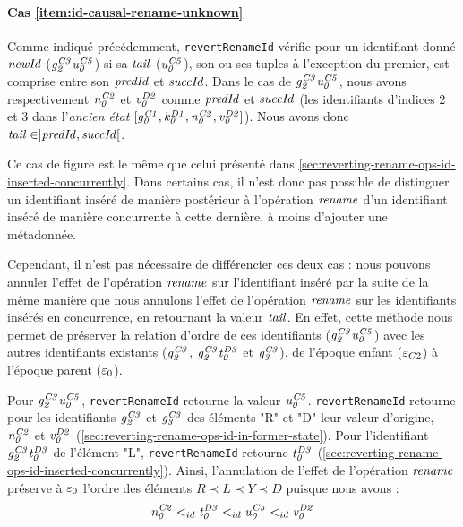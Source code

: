 \paragraph{Cas \ref{item:id-causal-rename-unknown}}

Comme indiqué précédemment, \texttt{revertRenameId} vérifie pour un identifiant donné $\mathit{newId}$ (\eg $\mathit{g}^{\mathit{C3}}_{\mathit{2}}\mathit{u}^{\mathit{C5}}_{\mathit{0}}$) si sa $\mathit{tail}$ ($\mathit{u}^{\mathit{C5}}_{\mathit{0}}$), \ie son ou ses tuples à l'exception du premier, est comprise entre son $\mathit{predId}$ et $\mathit{succId}$.
Dans le cas de $\mathit{g}^{\mathit{C3}}_{\mathit{2}}\mathit{u}^{\mathit{C5}}_{\mathit{0}}$, nous avons respectivement $\mathit{n}^{\mathit{C2}}_{\mathit{0}}$ et $\mathit{v}^{\mathit{D2}}_{\mathit{0}}$ comme $\mathit{predId}$ et $\mathit{succId}$ (les identifiants d'indices 2 et 3 dans l'\emph{ancien état} $[\mathit{g}^{\mathit{C1}}_{\mathit{0}},\mathit{k}^{\mathit{D1}}_{\mathit{0}},\mathit{n}^{\mathit{C2}}_{\mathit{0}},\mathit{v}^{\mathit{D2}}_{\mathit{0}}]$).
Nous avons donc $\mathit{tail} \in ]\mathit{predId},\mathit{succId}[$.

Ce cas de figure est le même que celui présenté dans \autoref{sec:reverting-rename-ops-id-inserted-concurrently}.
Dans certains cas, il n'est donc pas possible de distinguer un identifiant inséré de manière postérieur à l'opération $\mathit{rename}$ d'un identifiant inséré de manière concurrente à cette dernière, à moins d'ajouter une métadonnée.

Cependant, il n'est pas nécessaire de différencier ces deux cas : nous pouvons annuler l'effet de l'opération $\mathit{rename}$ sur l'identifiant inséré par la suite de la même manière que nous annulons l'effet de l'opération $\mathit{rename}$ sur les identifiants insérés en concurrence, \ie en retournant la valeur $\mathit{tail}$.
En effet, cette méthode nous permet de préserver la relation d'ordre de ces identifiants ($\mathit{g}^{\mathit{C3}}_{\mathit{2}}\mathit{u}^{\mathit{C5}}_{\mathit{0}}$) avec les autres identifiants existants ($\mathit{g}^{\mathit{C3}}_{\mathit{2}}$, $\mathit{g}^{\mathit{C3}}_{\mathit{2}}\mathit{t}^{\mathit{D3}}_{\mathit{0}}$ et $\mathit{g}^{\mathit{C3}}_{\mathit{3}}$), de l'époque enfant ($\varepsilon_{C2}$) à l'époque parent ($\varepsilon_{0}$).

Pour $\mathit{g}^{\mathit{C3}}_{\mathit{2}}\mathit{u}^{\mathit{C5}}_{\mathit{0}}$, \texttt{revertRenameId} retourne la valeur $\mathit{u}^{\mathit{C5}}_{\mathit{0}}$.
\texttt{revertRenameId} retourne pour les identifiants $\mathit{g}^{\mathit{C3}}_{\mathit{2}}$ et $\mathit{g}^{\mathit{C3}}_{\mathit{3}}$ des éléments "R" et "D" leur valeur d'origine, $\mathit{n}^{\mathit{C2}}_{\mathit{0}}$ et $\mathit{v}^{\mathit{D2}}_{\mathit{0}}$ (\autoref{sec:reverting-rename-ops-id-in-former-state}).
Pour l'identifiant $\mathit{g}^{\mathit{C3}}_{\mathit{2}}\mathit{t}^{\mathit{D3}}_{\mathit{0}}$ de l'élément "L", \texttt{revertRenameId} retourne $\mathit{t}^{\mathit{D3}}_{\mathit{0}}$ (\autoref{sec:reverting-rename-ops-id-inserted-concurrently}).
Ainsi, l'annulation de l'effet de l'opération $\mathit{rename}$ préserve à $\varepsilon_{0}$ l'ordre des éléments $R \prec L \prec Y \prec D$ puisque nous avons :
\[ \mathit{n}^{\mathit{C2}}_{\mathit{0}} <_{id} \mathit{t}^{\mathit{D3}}_{\mathit{0}} <_{id} \mathit{u}^{\mathit{C5}}_{\mathit{0}} <_{id} \mathit{v}^{\mathit{D2}}_{\mathit{0}}\]

